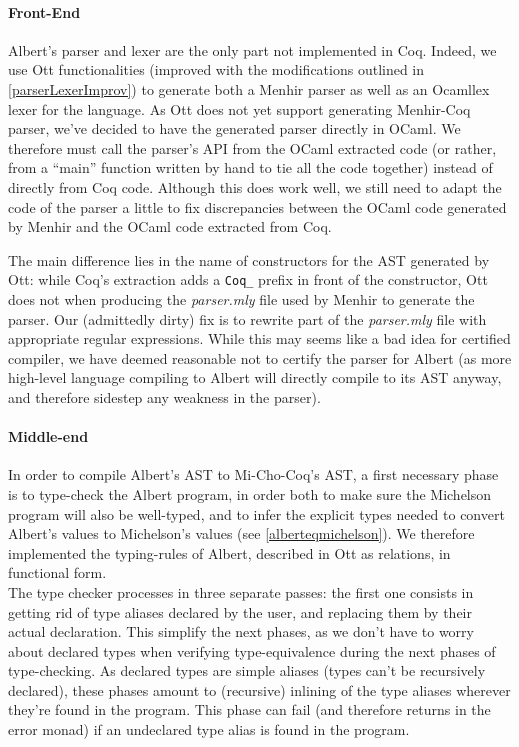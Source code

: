 \documentclass{report}
\begin{document}
\paragraph{Front-End}

Albert's parser and lexer are the only part not implemented in Coq. Indeed, we use Ott functionalities (improved with the modifications outlined in \ref{parserLexerImprov}) to generate both a Menhir parser as well as an Ocamllex lexer for the language. As Ott does not yet support generating Menhir-Coq parser, we've decided to have the generated parser directly in OCaml. We therefore must call the parser's API from the OCaml extracted code (or rather, from a ``main'' function written by hand to tie all the code together) instead of directly from Coq code. Although this does work well, we still need to adapt the code of the parser a little to fix discrepancies between the OCaml code generated by Menhir and the OCaml code extracted from Coq.

The main difference lies in the name of constructors for the AST generated by Ott: while Coq's extraction adds a \texttt{Coq\_} prefix in front of the constructor, Ott does not when producing the \textit{parser.mly} file used by Menhir to generate the parser. Our (admittedly dirty) fix is to rewrite part of the \textit{parser.mly} file with appropriate regular expressions. While this may seems like a bad idea for certified compiler, we have deemed reasonable not to certify the parser for Albert (as more high-level language compiling to Albert will directly compile to its AST anyway, and therefore sidestep any weakness in the parser).

\paragraph{Middle-end}

In order to compile Albert's AST to Mi-Cho-Coq's AST, a first necessary phase is to type-check the Albert program, in order both to make sure the Michelson program will also be well-typed, and to infer the explicit types needed to convert Albert's values to Michelson's values (see \ref{alberteqmichelson}). We therefore implemented the typing-rules of Albert, described in Ott as relations, in functional form.\\

The type checker processes in three separate passes: the first one consists in getting rid of type aliases declared by the user, and replacing them by their actual declaration. This simplify the next phases, as we don't have to worry about declared types when verifying type-equivalence during the next phases of type-checking. As declared types are simple aliases (types can't be recursively declared), these phases amount to (recursive) inlining of the type aliases wherever they're found in the program. This phase can fail (and therefore returns in the error monad) if an undeclared type alias is found in the program.
\end{document}
